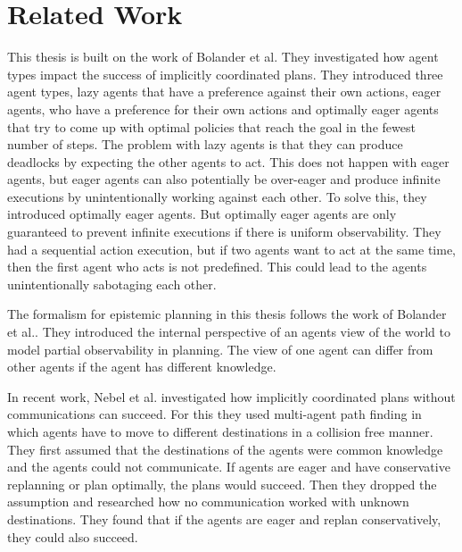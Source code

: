 \chapter{Related Work}\label{chap:relatedwork}

This thesis is built on the work of Bolander et al\cite{bolander2018better}. They investigated how agent types impact the success of implicitly coordinated plans. They introduced three agent types, lazy agents that have a preference against their own actions, eager agents, who have a preference for their own actions and optimally eager agents that try to come up with optimal policies that reach the goal in the fewest number of steps. The problem with lazy agents is that they can produce deadlocks by expecting the other agents to act. This does not happen with eager agents, but eager agents can also potentially be over-eager and produce infinite executions by unintentionally working against each other. To solve this, they introduced optimally eager agents. But optimally eager agents are only guaranteed to prevent infinite executions if there is uniform observability.
They had a sequential action execution, but if two agents want to act at the same time, then the first agent who acts is not predefined. This could lead to the agents unintentionally sabotaging each other.

The formalism for epistemic planning in this thesis follows the work of Bolander et al.\cite{bolander2011epistemic}. They introduced the internal perspective of an agents view of the world to model partial observability in planning. The view of one agent can differ from other agents if the agent has different knowledge.

In recent work, Nebel et al.\cite{nebel2019implicitly} investigated how implicitly coordinated plans without communications can succeed. For this they used multi-agent path finding in which agents have to move to different destinations in a collision free manner. They first assumed that the destinations of the agents were common knowledge and the agents could not communicate. If agents are eager and have conservative replanning or plan optimally, the plans would succeed. Then they dropped the assumption and researched how no communication worked with unknown destinations. They found that if the agents are eager and replan conservatively, they could also succeed.



